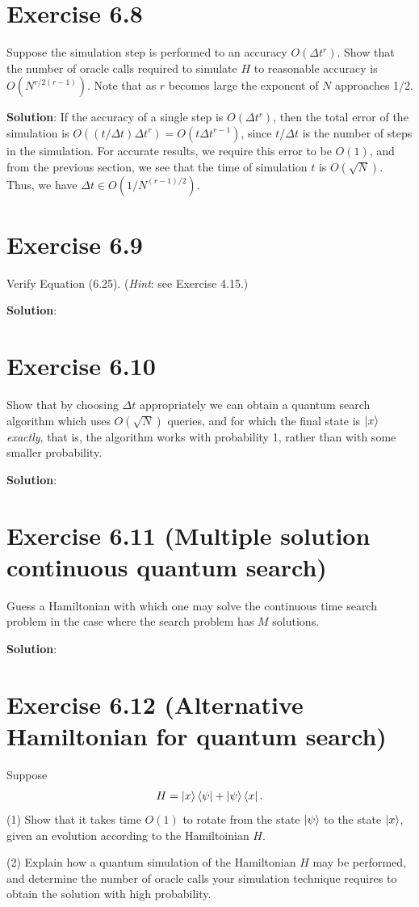 \documentclass{book}
\begin{document}
    \section*{Exercise 6.8}
        Suppose the simulation step is performed to an accuracy $O(\Delta t^r)$. Show that the number of oracle calls required to simulate $H$ to reasonable accuracy is $O(N^{r/2(r-1)})$. Note that as $r$ becomes large the exponent of $N$ approaches 1/2.
        
        \textbf{Solution}: If the accuracy of a single step is $O(\Delta t^r)$, then the total error of the simulation is $O((t/\Delta t) \Delta t^r)=O(t\Delta t^{r-1})$, since $t/\Delta t$ is the number of steps in the simulation. For accurate results, we require this error to be $O(1)$, and from the previous section, we see that the time of simulation $t$ is $O(\sqrt{N})$. Thus, we have $\Delta t \in O(1/N^{(r-1)/2})$. 
    
    \section*{Exercise 6.9}
        Verify Equation (6.25). (\emph{Hint}: see Exercise 4.15.)
        
        \textbf{Solution}:
    
    \section*{Exercise 6.10}
        Show that by choosing $\Delta t$ appropriately we can obtain a quantum
        search algorithm which uses $O(\sqrt{N})$ queries, and for which the final state is $\ket{x}$ \emph{exactly}, that is, the algorithm works with probability 1, rather than with some smaller probability.
        
        \textbf{Solution}:
    
    \section*{Exercise 6.11 (Multiple solution continuous quantum search)}
        Guess a Hamiltonian with which one may solve the continuous time search problem in the case where the search problem has $M$ solutions.
        
        \textbf{Solution}:
    
    \section*{Exercise 6.12 (Alternative Hamiltonian for quantum search)}
        Suppose
        \begin{align}
            H = \ket{x}\bra{\psi}+\ket{\psi}\bra{x}.
        \end{align}
        (1) Show that it takes time $O(1)$ to rotate from the state $\ket{\psi}$ to the state $\ket{x}$, given an evolution according to the Hamiltoinian $H$. \par
        (2) Explain how a quantum simulation of the Hamiltonian $H$ may be performed, and determine the number of oracle calls your simulation technique requires to obtain the solution with high probability.
        
\end{document}
